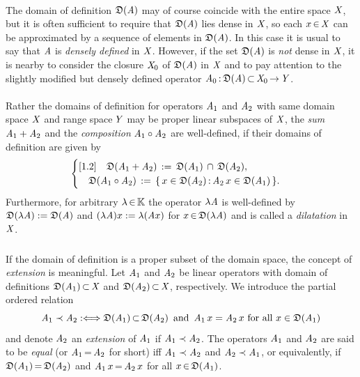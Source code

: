 \documentclass[11pt,twoside]{article}
\begin{document}
\paragraph{} %
The domain of definition $\mathfrak{D}(\mathit{A})$ may of course
coincide with the entire space $\mathit{X}$,
but it is often sufficient to require that 
$\mathfrak{D}(\mathit{A})$ lies dense in $\mathit{X}$,
so each $x {\,\in\,} \mathit{X}$ can be approximated
by a sequence of elements in $\mathfrak{D}(\mathit{A})$.
In this case it is usual to say
that $\mathit{A}$ is \textit{densely defined} in $\mathit{X}$.
However,
if the set $\mathfrak{D}(\mathit{A})$ is \textit{not} dense in $\mathit{X}$,
it is nearby to consider the closure $\mathit{X}_0$ of $\mathfrak{D}(\mathit{A})$ in $\mathit{X}$
and to pay attention to the slightly modified but densely defined operator
$\mathit{A}_0{\,:\,}\mathfrak{D}(\mathit{A}) {\,\subset\,} \mathit{X}_0 {\,\to\,} \mathit{Y}$.

\paragraph{} %
Rather the domains of definition for operators $\mathit{A}_1$ and $\mathit{A}_2$
with same domain space $\mathit{X}$ and range space\,$\mathit{Y}$
may be proper linear sub\-spaces of $\mathit{X}$,
the \textit{sum} $\mathit{A}_1 + \mathit{A}_2$ and
the \textit{composition} $\mathit{A}_1 \circ \mathit{A}_2$ are well-defined,
if their domains of definition are given by
\[
\begin{cases}[1.2]
\quad 
\mathfrak{D}(\mathit{A}_1 + \mathit{A}_2) \,:=\,
\mathfrak{D}(\mathit{A}_1) \, \cap \, \mathfrak{D}(\mathit{A}_2),\\
\quad
\mathfrak{D}(\mathit{A}_1 \circ \mathit{A}_2) \,:=\,
\{\, x \in \mathfrak{D}(\mathit{A}_2) {\,:\,} \mathit{A}_2 \, x \in \mathfrak{D}(\mathit{A}_1)\,\}.\\
\end{cases}
\]
Furthermore,
for arbitrary $\lambda {\,\in\,} {\mathbb{K}}$
the operator $\lambda \mathit{A}$ is well-defined by
$\mathfrak{D}(\lambda \mathit{A}) := \mathfrak{D}(\mathit{A})$ and
$(\lambda \mathit{A}) x := \lambda (\mathit{A} x)$
for $x {\,\in\,} \mathfrak{D}(\lambda \mathit{A})$
and is called a \textit{dilatation} in $\mathit{X}$.

\subparagraph{} %
If the domain of definition is a proper subset of the domain space,
the concept of \textit{extension} is meaningful.
Let $\mathit{A}_1$ and $\mathit{A}_2$ be linear operators
with domain of definitions $\mathfrak{D}(\mathit{A}_1) {\,\subset\,} \mathit{X}$
and $\mathfrak{D}(\mathit{A}_2) {\,\subset\,} \mathit{X}$,
respectively.
We introduce the partial ordered relation
\[
\mathit{A}_1 \prec \mathit{A}_2
: \Longleftrightarrow 
\mathfrak{D}(\mathit{A}_1) {\,\subset\,} \mathfrak{D}(\mathit{A}_2)
\, \mbox{ and } \,
\mathit{A}_1 \, x = \mathit{A}_2 \, x
\mbox{ for all } x \in \mathfrak{D}(\mathit{A}_1)
\]
and denote $\mathit{A}_2$ an \textit{extension} of $\mathit{A}_1$
if $\mathit{A}_1 \prec \mathit{A}_2$.
The operators $\mathit{A}_1$ and $\mathit{A}_2$ are said to be \textit{equal}
(or $\mathit{A}_1 {\,=\,} \mathit{A}_2$ for short)
iff $\mathit{A}_1 \prec \mathit{A}_2$ and $\mathit{A}_2 \prec \mathit{A}_1$,
or equivalently,
if $\mathfrak{D}(\mathit{A}_1) {\,=\,} \mathfrak{D}(\mathit{A}_2)$ and
$\mathit{A}_1\,x {\,=\,} \mathit{A}_2\,x$ for all $x {\,\in\,} \mathfrak{D}(\mathit{A}_1)$.
\end{document}
